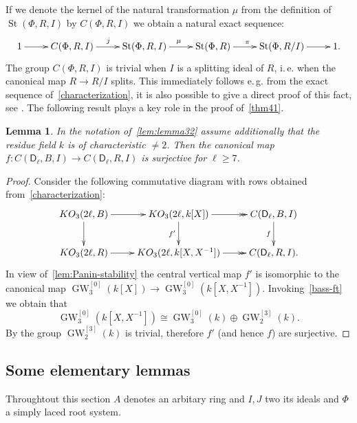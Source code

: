 \documentclass[oneside, 8pt]{amsart}
\newtheorem{lemma}{Lemma}
\theoremstyle{remark}
\theoremstyle{definition}
\DeclareMathOperator{\St}{St}
\DeclareMathOperator{\GW}{GW}
\newcommand{\rD}{\mathsf{D}}
\numberwithin{equation}{section}
\begin{document}
If we denote the kernel of the natural transformation $\mu$ from the definition of $\St(\Phi, R, I)$ by $C(\Phi, R, I)$ we obtain a natural exact sequence:
\begin{equation} \label{relSteinberg-def}
 \xymatrix{ 1 \ar[r] & C(\Phi, R, I) \ar[r]^{j} & \St(\Phi, R, I) \ar[r]^{\mu} & \St(\Phi, R) \ar[r]^{\pi} & \St(\Phi, R/I) \ar[r] & 1.}
\end{equation}
The group $C(\Phi, R, I)$ is trivial when $I$ is a splitting ideal of $R$, i.\,e. when the canonical map $R \to R/I$ splits.
This immediately follows e.\,g. from the exact sequence of~\cref{characterization}, it is also possible to give a direct proof of this fact, see \cite[Lemma~8]{S15}.
The following result plays a key role in the proof of~\cref{thm41}.
\begin{lemma} \label{lem:prop41}
In the notation of~\cref{lem:lemma32} assume additionally that the residue field $k$ is of characteristic $\neq 2$.
Then the canonical map $f\colon C(\rD_\ell, B, I) \to C(\rD_\ell, R, I)$ is surjective for $\ell \geq 7$.
\end{lemma}
\begin{proof}
  Consider the following commutative diagram with rows obtained from~\cref{characterization}:
\begin{equation*}\xymatrix{
 KO_3(2\ell, B) \ar[r] \ar[d] & KO_3(2\ell, k[X]) \ar[d]_{f'} \ar@{->>}[r] & \ar[d]_{f} C(\rD_\ell, B, I) \\
 KO_3(2\ell, R) \ar[r]        & KO_3(2\ell, k[X, X^{-1}]) \ar@{->>}[r]        & C(\rD_\ell, R, I).}\end{equation*}
In view of~\cref{lem:Panin-stability} the central vertical map $f'$ is isomorphic to the canonical map $\GW_3^{[0]}(k[X]) \to \GW_3^{[0]}(k[X, X^{-1}])$.
Invoking~\cref{bass-ft} we obtain that \[\GW_3^{[0]}(k[X, X^{-1}]) \cong \GW_3^{[0]}(k) \oplus \GW_2^{[3]}(k).\]
By \cite[Lemma~2.2]{FRS12} the group $\GW_2^{[3]}(k)$ is trivial, therefore $f'$ (and hence $f$) are surjective.
\end{proof}

\subsection{Some elementary lemmas}
\begin{comment}
Hall-Witt identity
\[ [[ y^{-1}, x], z] ^ {y^{-1}}  [[ z^{-1}, y], x] ^ {z^{-1}}  [[ x^{-1}, z], y] ^ {x^{-1}} = 1 \]
\[ [[ y^{-1}, x], z]  \cdot [[ z^{-1}, y], x] ^ {z^{-1}y} \cdot  [[ x^{-1}, z], y] ^ {x^{-1}y} = 1. \]
\[ [[ z^{-1}, y^{-1}], x] ^ {z^{-1}y^{-1}} \cdot  [[ x^{-1}, z], y^{-1}] ^ {x^{-1}y^{-1}} = [z, [ y, x]] . \]
\[  . \]
\end{comment}
Throughtout this section $A$ denotes an arbitary ring and $I, J$ two its ideals and $\Phi$ a simply laced root system.
\end{document}
